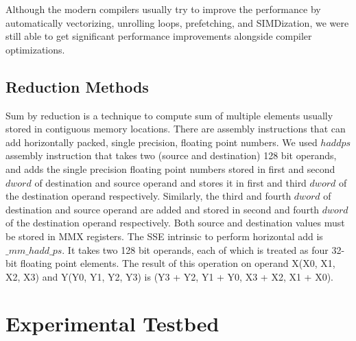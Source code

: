 \documentclass{IEEEtran}
\begin{document}
Although the modern compilers usually try to improve the performance by automatically vectorizing, unrolling loops, prefetching, and SIMDization, we were still able to get significant performance improvements alongside compiler optimizations.

\subsection{Reduction Methods}

\label{sub:reduction} Sum by reduction is a technique to compute sum of multiple elements usually stored in contiguous memory locations. There are assembly instructions that can add horizontally packed, single precision, floating point numbers. We used $haddps$ assembly instruction that takes two (source and destination) 128 bit operands, and adds the single precision floating point numbers stored in first and second $dword$ of destination and source operand and stores it in first and third $dword$ of the destination operand respectively. Similarly, the third and fourth $dword$ of destination and source operand are added and stored in second and fourth $dword$ of the destination operand respectively. Both source and destination values must be stored in MMX registers. The SSE intrinsic to perform horizontal add is $\_mm\_hadd\_ps$. It takes two 128 bit operands, each of which is treated as four 32-bit floating point elements. The result of this operation on operand X(X0, X1, X2, X3) and Y(Y0, Y1, Y2, Y3) is (Y3 + Y2, Y1 + Y0, X3 + X2, X1 + X0).

\section{Experimental Testbed}
\label{sec:expt}
\end{document}
